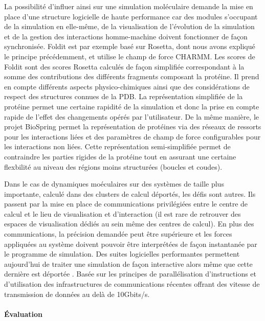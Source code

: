 La possibilité d'influer ainsi sur une simulation moléculaire demande la mise en place d'une structure logicielle de haute performance car des modules s'occupant de la simulation en elle-même, de la visualisation de l'évolution de la simulation et de la gestion des interactions homme-machine doivent fonctionner de façon synchronisée. Foldit est par exemple basé sur Rosetta, dont nous avons expliqué le principe précédemment, et utilise le champ de force CHARMM. Les scores de Foldit sont des scores Rosetta calculés de façon simplifiée correspondant à la somme des contributions des différents fragments composant la protéine. Il prend en compte différents aspects physico-chimiques ainsi que des considérations de respect des structures connues de la PDB.
La représentation simplifiée de la protéine permet une certaine rapidité de la simulation et donc la prise en compte rapide de l'effet des changements opérés par l'utilisateur. De la même manière, le projet BioSpring permet la représentation de protéines via des réseaux de ressorts pour les interactions liées et des paramètres de champ de force configurables pour les interactions non liées. Cette représentation semi-simplifiée permet de contraindre les parties rigides de la protéine tout en assurant une certaine flexbilité au niveau des régions moins structurées (boucles et coudes).

Dans le cas de dynamiques moéculaires sur des systèmes de taille plus importante, calculé dans des clusters de calcul déportés, les défis sont autres. Ils passent par la mise en place de communications privilégiées entre le centre de calcul et le lieu de visualisation et d'interaction (il est rare de retrouver des espaces de visualisation dédiés au sein même des centres de calcul). En plus des communications, la précision demandée peut être supérieure et les forces appliquées au système doivent pouvoir être interprétées de façon instantanée par le programme de simulation. Des suites logicielles performantes permettent aujourd'hui de traiter une simulation de façon interactive alors même que cette dernière est déportée \cite{dreher2014exaviz}. Basée sur les principes de parallélisation d'instructions et d'utilisation des infrastructures de communications récentes offrant des vitesse de transmission de données au delà de 10Gbits/s.

\paragraph{Évaluation} \label{simu_eval}

